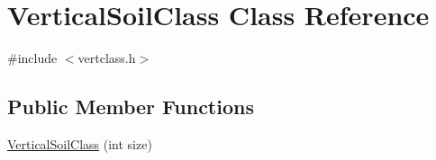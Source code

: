 \hypertarget{class_vertical_soil_class}{}\section{Vertical\+Soil\+Class Class Reference}
\label{class_vertical_soil_class}


{\ttfamily \#include $<$vertclass.\+h$>$}

\subsection*{Public Member Functions}
\begin{DoxyCompactItemize}
\item 
\hyperlink{class_vertical_soil_class_afdda41232244da9228c8655a153220f0}{Vertical\+Soil\+Class} (int size)
\end{DoxyCompactItemize}
